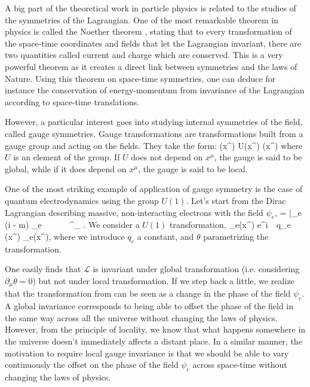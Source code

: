     A big part of the theoretical work in particle physics is related to the studies of
    the symmetries of the Lagrangian. One of the most remarkable theorem in physics is
    called the Noether theorem \cite{Noether}, stating that to every transformation of the space-time
    coordinates and fields that let the Lagrangian invariant, there are two quantities
    called current and charge which are conserved. This is a very powerful theorem as it
    creates a direct link between symmetries and the laws of Nature. Using this theorem on
    space-time symmetries, one can deduce for instance the conservation of energy-momentum
    from invariance of the Lagrangian according to space-time translations.

    However, a particular interest goes into studying internal symmetries of the field,
    called gauge symmetries. Gauge transformations are transformations built from a gauge
    group and acting on the fields. They take the form:
    {
        \psi(x^\mu)
        \rightarrow
        U(x^\mu) \psi(x^\mu)
    }
    where $U$ is an element of the group. If $U$ does not depend on $x^\mu$, the gauge is
    said to be global, while if it does depend on $x^\mu$, the gauge is said to be local.

    One of the most striking example of application of gauge symmetry is the case of
    quantum electrodynamics using the group $U(1)$. Let's start from the Dirac Lagrangian
    describing massive, non-interacting electrons with the field $\psi_e$,
    {
        =
        \bar{\psi_e} (i \dslash - m) \psi_e
        \,\,\,\,\,\,\,
        \,\,\,\,\,\,\,
        \dslash {} \gamma^\mu \partial_\mu
        .
    }
    We consider a $U(1)$ transformation,
    {
        \psi_e(x^\mu)
        \rightarrow
        e^{i \,\cdot\, q_e \,\cdot\, \theta(x^\mu)} \psi_e(x^\mu),
    }
    where we introduce $q_e$ a constant, and $\theta$ parametrizing the transformation.

    One easily finds that $\mathcal{L}$ is invariant under global transformation (i.e.
    considering $\partial_\mu \theta = 0$) but not under local transformation.
    If we step back a little, we realize that the transformation from 
    can be seen as a change in the phase of the field $\psi_e$. A global invariance
    corresponds to being able to offset the phase of the field in the same way across all
    the universe without changing the laws of physics. However, from the principle of
    locality, we know that what happens somewhere in the universe doesn't immediately affects
    a distant place. In a similar manner, the motivation to require local gauge invariance
    is that we should be able to vary continuously the offset on the phase of the
    field $\psi_e$ across space-time without changing the laws of physics.

